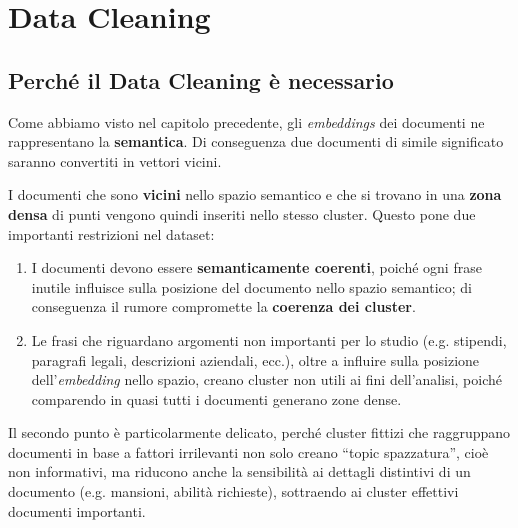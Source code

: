 
\newcommand{\legenditem}[2]{\textcolor{#2}{\rule{0.8em}{0.8em}}\hspace{0.5em}\textbf{#1}}

\chapter{Data Cleaning}
\section{Perché il Data Cleaning è necessario}

Come abbiamo visto nel capitolo precedente, gli \textit{embeddings} dei documenti ne rappresentano la \textbf{semantica}. Di conseguenza due documenti di simile significato saranno convertiti in vettori vicini.

I documenti che sono \textbf{vicini} nello spazio semantico e che si trovano in una \textbf{zona densa} di punti vengono quindi inseriti nello stesso cluster. Questo pone due importanti restrizioni nel dataset:

\begin{enumerate}
    \item I documenti devono essere \textbf{semanticamente coerenti}, poiché ogni frase inutile influisce sulla posizione del documento nello spazio semantico; di conseguenza il rumore compromette la \textbf{coerenza dei cluster}.
    \item Le frasi che riguardano argomenti non importanti per lo studio (e.g. stipendi, paragrafi legali, descrizioni aziendali, ecc.), oltre a influire sulla posizione dell'\textit{embedding} nello spazio, creano cluster non utili ai fini dell'analisi, poiché comparendo in quasi tutti i documenti generano zone dense.
\end{enumerate}

Il secondo punto è particolarmente delicato, perché cluster fittizi che raggruppano documenti in base a fattori irrilevanti non solo creano ``topic spazzatura'', cioè non informativi, ma riducono anche la sensibilità ai dettagli distintivi di un documento (e.g. mansioni, abilità richieste), sottraendo ai cluster effettivi documenti importanti.

